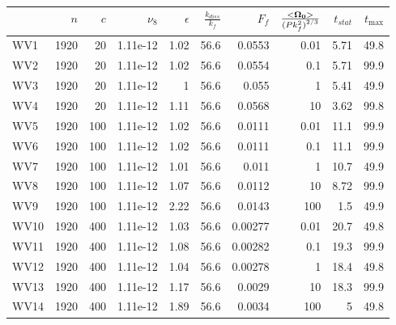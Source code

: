 \documentclass[a4paper]{article}
\begin{document}
\begin{tabular}{lrrrrrrrrr}
\toprule
{} &   $n$ &  $c$ &  $\nu_8$ &  $\epsilon$ &  $\frac{k_{diss}}{k_f}$ &   $F_f$ &  $\frac{<\bf \Omega_0 >}{{(P k_f^2)}^{2/3}}$ &  $t_{stat}$ &  $t_{\max}$ \\
\midrule
WV1  &  1920 &   20 & 1.11e-12 &        1.02 &                    56.6 &  0.0553 &                                         0.01 &        5.71 &        49.8 \\
WV2  &  1920 &   20 & 1.11e-12 &        1.02 &                    56.6 &  0.0554 &                                          0.1 &        5.71 &        99.9 \\
WV3  &  1920 &   20 & 1.11e-12 &           1 &                    56.6 &   0.055 &                                            1 &        5.41 &        49.9 \\
WV4  &  1920 &   20 & 1.11e-12 &        1.11 &                    56.6 &  0.0568 &                                           10 &        3.62 &        99.8 \\
WV5  &  1920 &  100 & 1.11e-12 &        1.02 &                    56.6 &  0.0111 &                                         0.01 &        11.1 &        99.9 \\
WV6  &  1920 &  100 & 1.11e-12 &        1.02 &                    56.6 &  0.0111 &                                          0.1 &        11.1 &        99.9 \\
WV7  &  1920 &  100 & 1.11e-12 &        1.01 &                    56.6 &   0.011 &                                            1 &        10.7 &        49.9 \\
WV8  &  1920 &  100 & 1.11e-12 &        1.07 &                    56.6 &  0.0112 &                                           10 &        8.72 &        99.9 \\
WV9  &  1920 &  100 & 1.11e-12 &        2.22 &                    56.6 &  0.0143 &                                          100 &         1.5 &        49.9 \\
WV10 &  1920 &  400 & 1.11e-12 &        1.03 &                    56.6 & 0.00277 &                                         0.01 &        20.7 &        49.8 \\
WV11 &  1920 &  400 & 1.11e-12 &        1.08 &                    56.6 & 0.00282 &                                          0.1 &        19.3 &        99.9 \\
WV12 &  1920 &  400 & 1.11e-12 &        1.04 &                    56.6 & 0.00278 &                                            1 &        18.4 &        49.8 \\
WV13 &  1920 &  400 & 1.11e-12 &        1.17 &                    56.6 &  0.0029 &                                           10 &        18.3 &        99.9 \\
WV14 &  1920 &  400 & 1.11e-12 &        1.89 &                    56.6 &  0.0034 &                                          100 &           5 &        49.8 \\
\bottomrule
\end{tabular}
\end{document}
